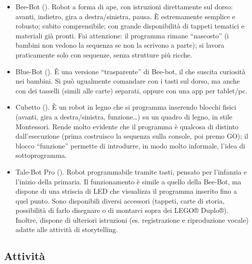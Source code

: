 \begin{itemize}
\item
  Bee-Bot (). Robot a forma di ape, con istruzioni direttamente sul dorso: avanti, indietro, gira a destra/sinistra, pausa. È estremamente semplice e robusto; subito comprensibile; con grande disponibilità di tappeti tematici e materiali già pronti. Fai attenzione: il programma rimane ``nascosto'' (i bambini non vedono la sequenza se non la scrivono a parte); si lavora praticamente solo con sequenze, senza strutture più ricche.
\item
  Blue-Bot (). È una versione ``trasparente'' di Bee-bot, il che suscita curiosità nei bambini. Si può ugualmente comandare con i tasti sul dorso, ma anche con dei tasselli (simili alle carte) separati, oppure con una app per tablet/pc.
\item
  Cubetto (). È un robot in legno che si programma inserendo blocchi fisici (avanti, gira a destra/sinistra, funzione\ldots) su un quadro di legno, in stile Montessori. Rende molto evidente che il programma è qualcosa di distinto dall'esecuzione (prima costruisco la sequenza sulla console, poi premo GO); il blocco ``funzione'' permette di introdurre, in modo molto informale, l'idea di sottoprogramma.
\item
  Tale-Bot Pro (). Robot programmabile tramite tasti, pensato per l'infanzia e l'inizio della primaria. Il funzionamento è simile a quello della Bee-Bot, ma dispone di una striscia di LED che visualizza il programma inserito fino a quel punto. Sono disponibili diversi accessori (tappeti, carte di storia, possibilità di farlo disegnare o di montarci sopra dei LEGO® Duplo®). Inoltre, dispone di ulteriori istruzioni (es. registrazione e riproduzione vocale) adatte alle attività di storytelling.
\end{itemize}


\subsection{Attività}


